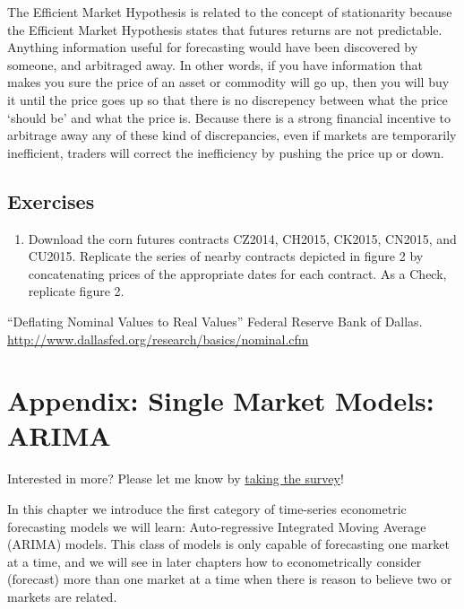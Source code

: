 \documentclass[
  letterpaper,
  DIV=11,
  numbers=noendperiod]{scrreprt}
\providecommand{\tightlist}{%
  \setlength{\itemsep}{0pt}\setlength{\parskip}{0pt}}\usepackage{longtable,booktabs,array}
\begin{document}
The Efficient Market Hypothesis is related to the concept of
stationarity because the Efficient Market Hypothesis states that futures
returns are not predictable. Anything information useful for forecasting
would have been discovered by someone, and arbitraged away. In other
words, if you have information that makes you sure the price of an asset
or commodity will go up, then you will buy it until the price goes up so
that there is no discrepency between what the price `should be' and what
the price is. Because there is a strong financial incentive to arbitrage
away any of these kind of discrepancies, even if markets are temporarily
inefficient, traders will correct the inefficiency by pushing the price
up or down.

\hypertarget{exercises-10}{%
\section{Exercises}\label{exercises-10}}

\begin{enumerate}
\def\labelenumi{\arabic{enumi}.}
\tightlist
\item
  Download the corn futures contracts CZ2014, CH2015, CK2015, CN2015,
  and CU2015. Replicate the series of nearby contracts depicted in
  figure 2 by concatenating prices of the appropriate dates for each
  contract. As a Check, replicate figure 2.
\end{enumerate}

``Deflating Nominal Values to Real Values'' Federal Reserve Bank of
Dallas. \url{http://www.dallasfed.org/research/basics/nominal.cfm}


\hypertarget{appendix-single-market-models-arima}{%
\chapter{Appendix: Single Market Models:
ARIMA}\label{appendix-single-market-models-arima}}

{Interested in more? Please let me know by}
\href{https://forms.gle/Q3VByCQZHjfQSy9D7}{taking the survey}!

In this chapter we introduce the first category of time-series
econometric forecasting models we will learn: Auto-regressive Integrated
Moving Average (ARIMA) models. This class of models is only capable of
forecasting one market at a time, and we will see in later chapters how
to econometrically consider (forecast) more than one market at a time
when there is reason to believe two or markets are related.
\end{document}
